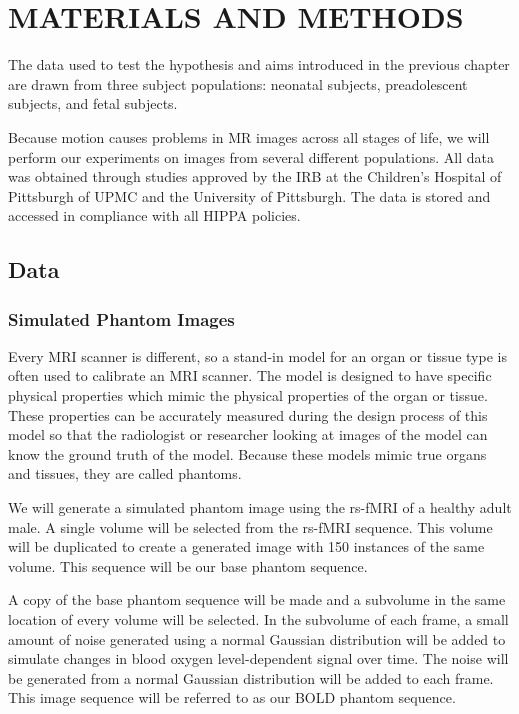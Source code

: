 \chapter{MATERIALS AND METHODS}

The data used to test the hypothesis and aims introduced in the previous chapter are drawn from three subject populations: neonatal subjects, preadolescent subjects, and fetal subjects.


Because motion causes problems in MR images across all stages of life, we will perform our experiments on images from several different populations. All data was obtained through studies approved by the IRB at the Children's Hospital of Pittsburgh of UPMC and the University of Pittsburgh. The data is stored and accessed in compliance with all HIPPA policies.

\section{Data}

\subsection{Simulated Phantom Images}

Every MRI scanner is different, so a stand-in model for an organ or tissue type is often used to calibrate an MRI scanner. The model is designed to have specific physical properties which mimic the physical properties of the organ or tissue. These properties can be accurately measured during the design process of this model so that the radiologist or researcher looking at images of the model can know the ground truth of the model. Because these models mimic true organs and tissues, they are called phantoms. 

We will generate a simulated phantom image using the rs-fMRI of a healthy adult male. A single volume will be selected from the rs-fMRI sequence. This volume will be duplicated to create a generated image with 150 instances of the same volume. This sequence will be our base phantom sequence. 

A copy of the base phantom sequence will be made and a subvolume in the same location of every volume will be selected. In the subvolume of each frame, a small amount of noise generated using a normal Gaussian distribution will be added to simulate changes in blood oxygen level-dependent signal over time. The noise will be generated from a normal Gaussian distribution will be added to each frame. This image sequence will be referred to as our BOLD phantom sequence.


